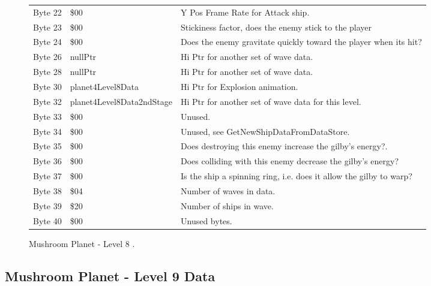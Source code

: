 \begin{figure}[H]
{\begin{adjustbox}{width=12cm}
\begin{tabular}{lll}
 Byte 22 & \$00                       & Y Pos Frame Rate for Attack ship.                                  \\
 Byte 23 & \$00                       & Stickiness factor, does the enemy stick to the player              \\
 Byte 24 & \$00                       & Does the enemy gravitate quickly toward the player when its hit?   \\
 Byte 26 & nullPtr                   & Hi Ptr for another set of wave data.                               \\
 Byte 28 & nullPtr                   & Hi Ptr for another set of wave data.                               \\
 Byte 30 & planet4Level8Data         & Hi Ptr for Explosion animation.                                    \\
 Byte 32 & planet4Level8Data2ndStage & Hi Ptr for another set of wave data for this level.                \\
 Byte 33 & \$00                       & Unused.                                                            \\
 Byte 34 & \$00                       & Unused, see GetNewShipDataFromDataStore.                           \\
 Byte 35 & \$00                       & Does destroying this enemy increase the gilby's energy?.           \\
 Byte 36 & \$00                       & Does colliding with this enemy decrease the gilby's energy?        \\
 Byte 37 & \$00                       & Is the ship a spinning ring, i.e. does it allow the gilby to warp? \\
 Byte 38 & \$04                       & Number of waves in data.                                           \\
 Byte 39 & \$20                       & Number of ships in wave.                                           \\
 Byte 40 & \$00                       & Unused bytes.                                                      \\
\bottomrule
\end{tabular}

  \end{adjustbox}

  }\caption*{Mushroom Planet - Level 8
.}
\end{figure}

\clearpage
\subsection{Mushroom Planet - Level 9 Data}

